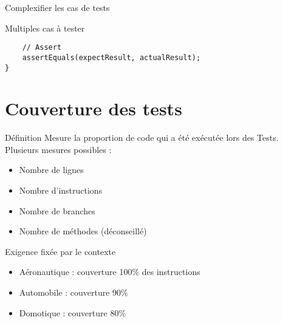 \documentclass[a4paper]{beamer}
\begin{document}
{\begin{frame}[fragile]{Complexifier les cas de tests}
\begin{exampleblock}{Multiples cas à tester}
\begin{lstlisting}
    // Assert
    assertEquals(expectResult, actualResult);
}
		\end{lstlisting}
	\end{exampleblock}
\end{frame}


\section{Couverture des tests}
\begin{frame}
\begin{block}{Définition}
Mesure la proportion de code qui a été exécutée lors des Tests.\\

Plusieurs mesures possibles : 
\begin{itemize}
\item Nombre de lignes
\item Nombre d'instructions
\item Nombre de branches
\item Nombre de méthodes (déconseillé)
\end{itemize}
\end{block}

\begin{block}{Exigence fixée par le contexte}
\begin{itemize}
\item Aéronautique : couverture 100\% des instructions
\item Automobile : couverture 90\%
\item Domotique : couverture 80\%
\end{itemize}

\end{block}

\end{frame}


\begin{frame}{}

\end{frame}

}
\end{document}
